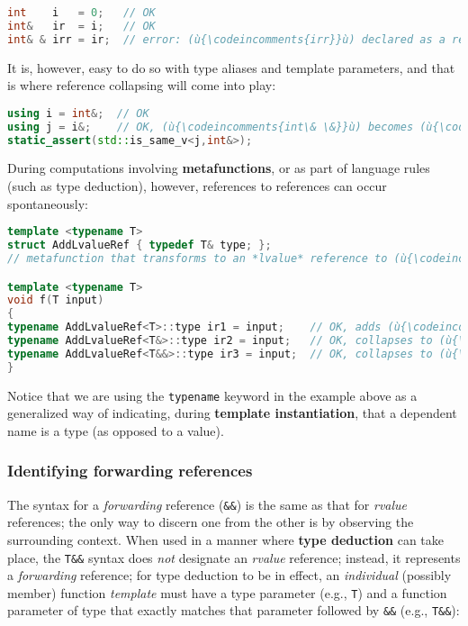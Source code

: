 \begin{lstlisting}[language=C++]
int    i   = 0;   // OK
int&   ir  = i;   // OK
int& & irr = ir;  // error: (ù{\codeincomments{irr}}ù) declared as a reference to a reference
\end{lstlisting}

\noindent It is, however, easy to do so with type aliases and template parameters,
and that is where reference collapsing will come into play:

\begin{lstlisting}[language=C++]
using i = int&;  // OK
using j = i&;    // OK, (ù{\codeincomments{int\& \&}}ù) becomes (ù{\codeincomments{int\&}}ù).
static_assert(std::is_same_v<j,int&>);
\end{lstlisting}

\noindent During computations involving \textbf{metafunctions}, or as part of
language rules (such as type deduction), however, references to
references can occur spontaneously:

\begin{lstlisting}[language=C++]
template <typename T>
struct AddLvalueRef { typedef T& type; };
// metafunction that transforms to an *lvalue* reference to (ù{\codeincomments{T}}ù)

template <typename T>
void f(T input)
{
typename AddLvalueRef<T>::type ir1 = input;    // OK, adds (ù{\codeincomments{\&}}ù) to make (ù{\codeincomments{T\&}}ù)
typename AddLvalueRef<T&>::type ir2 = input;   // OK, collapses to (ù{\codeincomments{T\&}}ù)
typename AddLvalueRef<T&&>::type ir3 = input;  // OK, collapses to (ù{\codeincomments{T\&}}ù)
}
\end{lstlisting}

\noindent Notice that we are using the \texttt{typename} keyword in the example above as a
generalized way of indicating, during \textbf{template instantiation},
that a dependent name is a type (as opposed to a value).

\subsubsection[Identifying forwarding references]{Identifying forwarding references}\label{identifying-forwarding-references}

The syntax for a \emph{forwarding} reference (\texttt{\&\&}) is the same
as that for \emph{rvalue} references; the only way to discern one from
the other is by observing the surrounding context. When used in a manner
where \textbf{type deduction} can take place, the \texttt{T\&\&} syntax
does \emph{not} designate an \emph{rvalue} reference; instead, it
represents a \emph{forwarding} reference; for type deduction to be in
effect, an \emph{individual} (possibly member) function \emph{template}
must have a type parameter (e.g., \texttt{T}) and a function parameter of
type that exactly matches that parameter followed by \texttt{\&\&}
(e.g., \texttt{T\&\&}):

